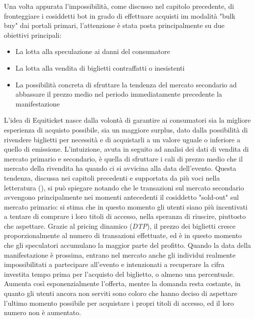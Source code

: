 Una volta appurata l'impossibilità, come discusso nel capitolo precedente, di fronteggiare i cosiddetti bot in grado di effettuare acquisti im modalità "bulk buy" dai portali primari, l'attenzione è stata posta principalmente su due obiettivi principali: 
\begin{itemize}
\item La lotta alla speculazione ai danni del consumatore
\item La lotta alla vendita di biglietti contraffatti o inesistenti 
\item La possibilità concreta di sfruttare la tendenza del mercato secondario ad abbassare il prezzo medio nel periodo immediatamente precedente la manifestazione
\end{itemize}
L'idea di Equiticket nasce dalla volontà di garantire ai consumatori sia la migliore esperienza di acquisto possibile, sia un maggiore surplus, dato dalla possibilità di rivendere biglietti per necessità e di acquistarli a un valore uguale o inferiore a quello di emissione. L'intuizione, avuta in seguito ad analisi dei dati di vendita di mercato primario e secondario, è quella di sfruttare i cali di prezzo medio che il mercato della rivendita ha quando ci si avvicina alla data dell'evento. 
Questa tendenza, discussa nei capitoli precedenti e supportata da più voci nella letteratura (\cite{tompkins2018ticket, courty2017ticket}), si può spiegare notando che le transazioni sul mercato secondario avvengono principalmente nei momenti antecedenti il cosiddetto "sold-out" sul mercato primario: si stima che in questo momento gli utenti siano più incentivati a tentare di comprare i loro titoli di accesso, nella speranza di riuscire, piuttosto che aspettare. Grazie al pricing dinamico (\textit{DTP}), il prezzo dei biglietti cresce  proporzionalmente al numero di transazioni effettuate, ed è in questo momento che gli speculatori accumulano la maggior parte del profitto. Quando la data della manifestazione è prossima, entrano nel mercato anche gli individui realmente impossibilitati a partecipare all'evento e intenzionati a recuperare la cifra investita tempo prima per l'acquisto del biglietto, o almeno una percentuale. 
Aumenta così esponenzialmente l'offerta, mentre la domanda resta costante, in quanto gli utenti ancora non serviti sono coloro che hanno deciso di aspettare l'ultimo momento possibile per acquistare i propri titoli di accesso, ed il loro numero non è aumentato. 
